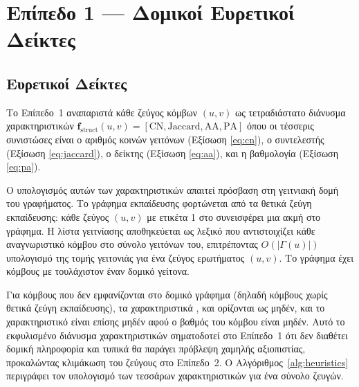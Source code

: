 \section{Επίπεδο 1 --- Δομικοί Ευρετικοί Δείκτες}
\label{sec:level1-heuristics}

\subsection{Ευρετικοί Δείκτες}
\label{subsec:heuristic-features}

Το Επίπεδο~1 αναπαριστά κάθε ζεύγος κόμβων $(u, v)$ ως τετραδιάστατο διάνυσμα
χαρακτηριστικών $\mathbf{f}_{\text{struct}}(u, v) = [\mathrm{CN}, \mathrm{Jaccard},
\mathrm{AA}, \mathrm{PA}]$ όπου οι τέσσερις συνιστώσες είναι ο αριθμός κοινών
γειτόνων (Εξίσωση \ref{eq:cn}), ο συντελεστής  (Εξίσωση \ref{eq:jaccard}),
ο δείκτης  (Εξίσωση \ref{eq:aa}), και η βαθμολογία  (Εξίσωση \ref{eq:pa}).

Ο υπολογισμός αυτών των χαρακτηριστικών απαιτεί πρόσβαση στη γειτνιακή δομή του
γραφήματος.
Το γράφημα εκπαίδευσης φορτώνεται από τα θετικά ζεύγη εκπαίδευσης: κάθε
ζεύγος $(u, v)$ με ετικέτα 1 στο \texttt{} συνεισφέρει μια ακμή στο
γράφημα.
Η λίστα γειτνίασης αποθηκεύεται ως λεξικό που αντιστοιχίζει κάθε αναγνωριστικό
κόμβου στο σύνολο γειτόνων του, επιτρέποντας $O(|\Gamma(u)|)$ υπολογισμό της τομής
γειτονιάς για ένα ζεύγος ερωτήματος $(u, v)$.
Το γράφημα έχει \GraphNodes{} κόμβους με
τουλάχιστον έναν δομικό γείτονα.

Για κόμβους που δεν εμφανίζονται στο δομικό γράφημα (δηλαδή κόμβους χωρίς θετικά
ζεύγη εκπαίδευσης), τα χαρακτηριστικά ,  και  ορίζονται ως μηδέν, και το
χαρακτηριστικό  είναι επίσης μηδέν αφού ο βαθμός του κόμβου είναι μηδέν.
Αυτό το
εκφυλισμένο διάνυσμα χαρακτηριστικών σηματοδοτεί στο Επίπεδο~1 ότι δεν διαθέτει
δομική πληροφορία και τυπικά θα παράγει πρόβλεψη χαμηλής αξιοπιστίας, προκαλώντας
κλιμάκωση του ζεύγους στο Επίπεδο~2.
Ο Αλγόριθμος~\ref{alg:heuristics} περιγράφει
τον υπολογισμό των τεσσάρων χαρακτηριστικών για ένα σύνολο ζευγών.


